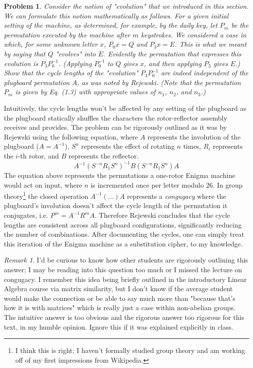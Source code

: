 \documentclass[12pt]{article}
\newenvironment{answer}
    {\begin{adjustwidth}{0pt}{0pt}}
    {\end{adjustwidth}}
\newtheorem{problem}{Problem}
\theoremstyle{remark}  %
\newtheorem*{remark}{Remark}
\begin{document}
    \setcounter{problem}{3}
    \begin{problem}
        Consider the notion of "evolution" that we introduced in this section. We can formulate this notion mathematically as follows. For a given initial setting of the machine, as determined, for example, by the daily key, let $P_m$ be the permutation executed by the machine after $m$ keystrokes. We considered a case in which, for some unknown letter $x$, $P_0x=Q$ and $P_3x=E$. This is what we meant by saying that $Q$ "evolves" into $E$. Evidently the permutation that expresses this evolution is $P_3P_0^{-1}$. (Applying $P_0^{-1}$ to $Q$ gives $x$, and then applying $P_3$ gives $E$.) Show that the cycle lengths of the "evolution" $P_3P_0^{-1}$ are indeed independent of the plugboard permutation $A$, as was noted by Rejewski. (Note that the permutation $P_m$ is given by Eq. (1.3) with appropriate values of $n_1$, $n_2$, and $n_3$.)
    \end{problem}
    \begin{answer}
        Intuitively, the cycle lengths won't be affected by any setting of the plugboard as the plugboard statically shuffles the characters the rotor-reflector assembly receives and provides. The problem can be rigorously outlined as it was by Rejewski using the following equation, where $A$ represents the involution of the plugboard ($A=A^{-1}$), $S^n$ represents the effect of rotating $n$ times, $R_i$ represents the $i$-th rotor, and $B$ represents the reflector. $$A^{-1} (S^{-n}R_1S^{n})^{-1} B (S^{-n}R_1 S^{n})A$$ The equation above represents the permutations a one-rotor Enigma machine would act on input, where $n$ is incremented once per letter modulo 26. In group theory\footnote{I think this is right; I haven't formally studied group theory and am working off of my first impressions from Wikipedia.} the closed operation $A^{-1}(\dots)A$ represents a \emph{congugacy} where the plugboard's involution doesn't affect the cycle length of the permutation it conjugates, i.e. $P^m=A^{-1}R^mA$. Therefore Rejewski concludes that the cycle lengths are consistent across all plugboard configurations, significantly reducing the number of combinations. After documenting the cycles, one can simply treat this iteration of the Enigma machine as a substitution cipher, to my knowledge.
    \end{answer}
    \begin{remark}
        I'd be curious to know how other students are rigorously outlining this answer; I may be reading into this question too much or I missed the lecture on congugacy. I remember this idea being briefly outlined in the introductory Linear Algebra course via matrix similarity, but I don't know if the average student would make the connection or be able to say much more than "because that's how it is with matrices" which is really just a case within non-abelian groups. The intuitive answer is too obvious and the rigorous answer too rigorous for this text, in my humble opinion. Ignore this if it was explained explicitly in class.
    \end{remark}
\end{document}
